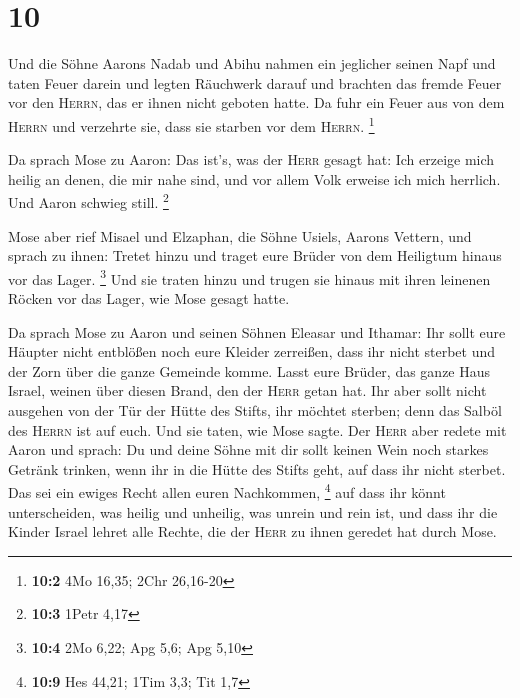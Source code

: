 \hypertarget{section-2}{%
\section{10}\label{section-2}}

 Und die Söhne Aarons Nadab und Abihu nahmen ein jeglicher
seinen Napf und taten Feuer darein und legten Räuchwerk darauf und
brachten das fremde Feuer vor den \textsc{Herrn}, das er ihnen nicht
geboten hatte.  Da fuhr ein Feuer aus von dem
\textsc{Herrn} und verzehrte sie, dass sie starben vor dem
\textsc{Herrn}. \footnote{\textbf{10:2} 4Mo 16,35; 2Chr 26,16-20}

 Da sprach Mose zu Aaron: Das ist's, was der \textsc{Herr}
gesagt hat: Ich erzeige mich heilig an denen, die mir nahe sind, und vor
allem Volk erweise ich mich herrlich. Und Aaron schwieg still.
\footnote{\textbf{10:3} 1Petr 4,17}

 Mose aber rief Misael und Elzaphan, die Söhne Usiels,
Aarons Vettern, und sprach zu ihnen: Tretet hinzu und traget eure Brüder
von dem Heiligtum hinaus vor das Lager. \footnote{\textbf{10:4} 2Mo
  6,22; Apg 5,6; Apg 5,10}  Und sie traten hinzu und
trugen sie hinaus mit ihren leinenen Röcken vor das Lager, wie Mose
gesagt hatte.

 Da sprach Mose zu Aaron und seinen Söhnen Eleasar und
Ithamar: Ihr sollt eure Häupter nicht entblößen noch eure Kleider
zerreißen, dass ihr nicht sterbet und der Zorn über die ganze Gemeinde
komme. Lasst eure Brüder, das ganze Haus Israel, weinen über diesen
Brand, den der \textsc{Herr} getan hat.  Ihr aber sollt
nicht ausgehen von der Tür der Hütte des Stifts, ihr möchtet sterben;
denn das Salböl des \textsc{Herrn} ist auf euch. Und sie taten, wie Mose
sagte.  Der \textsc{Herr} aber redete mit Aaron und
sprach:  Du und deine Söhne mit dir sollt keinen Wein noch
starkes Getränk trinken, wenn ihr in die Hütte des Stifts geht, auf dass
ihr nicht sterbet. Das sei ein ewiges Recht allen euren Nachkommen,
\footnote{\textbf{10:9} Hes 44,21; 1Tim 3,3; Tit 1,7} 
auf dass ihr könnt unterscheiden, was heilig und unheilig, was unrein
und rein ist,  und dass ihr die Kinder Israel lehret alle
Rechte, die der \textsc{Herr} zu ihnen geredet hat durch Mose.

